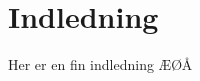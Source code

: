 \documentclass[../../main]{subfiles}
\begin{document}
\section{Indledning}
\label{sec:indledning}


Her er en fin indledning ÆØÅ
\end{document}
